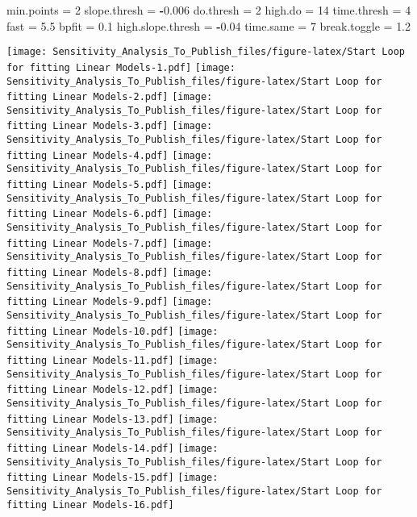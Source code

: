 \documentclass[
]{article}
\newenvironment{Shaded}{\begin{snugshade}}{\end{snugshade}}
\newcommand{\DecValTok}[1]{\textcolor[rgb]{0.00,0.00,0.81}{#1}}
\newcommand{\FloatTok}[1]{\textcolor[rgb]{0.00,0.00,0.81}{#1}}
\newcommand{\NormalTok}[1]{#1}
\newcommand{\OtherTok}[1]{\textcolor[rgb]{0.56,0.35,0.01}{#1}}
\newcommand{\SpecialCharTok}[1]{\textcolor[rgb]{0.81,0.36,0.00}{\textbf{#1}}}
\begin{document}
\begin{Shaded}
\begin{Highlighting}[]
\NormalTok{min.points }\OtherTok{=} \DecValTok{2}
\NormalTok{slope.thresh }\OtherTok{=} \SpecialCharTok{{-}}\FloatTok{0.006}
\NormalTok{do.thresh }\OtherTok{=} \DecValTok{2}
\NormalTok{high.do }\OtherTok{=} \DecValTok{14}
\NormalTok{time.thresh }\OtherTok{=} \DecValTok{4}
\NormalTok{fast }\OtherTok{=} \FloatTok{5.5} 
\NormalTok{bpfit }\OtherTok{=} \FloatTok{0.1}
\NormalTok{high.slope.thresh }\OtherTok{=} \SpecialCharTok{{-}}\FloatTok{0.04} 
\NormalTok{time.same }\OtherTok{=} \DecValTok{7}
\NormalTok{break.toggle }\OtherTok{=} \FloatTok{1.2}
\end{Highlighting}
\end{Shaded}

\texttt{[image: Sensitivity\_Analysis\_To\_Publish\_files/figure-latex/Start Loop for fitting Linear Models-1.pdf]}
\texttt{[image: Sensitivity\_Analysis\_To\_Publish\_files/figure-latex/Start Loop for fitting Linear Models-2.pdf]}
\texttt{[image: Sensitivity\_Analysis\_To\_Publish\_files/figure-latex/Start Loop for fitting Linear Models-3.pdf]}
\texttt{[image: Sensitivity\_Analysis\_To\_Publish\_files/figure-latex/Start Loop for fitting Linear Models-4.pdf]}
\texttt{[image: Sensitivity\_Analysis\_To\_Publish\_files/figure-latex/Start Loop for fitting Linear Models-5.pdf]}
\texttt{[image: Sensitivity\_Analysis\_To\_Publish\_files/figure-latex/Start Loop for fitting Linear Models-6.pdf]}
\texttt{[image: Sensitivity\_Analysis\_To\_Publish\_files/figure-latex/Start Loop for fitting Linear Models-7.pdf]}
\texttt{[image: Sensitivity\_Analysis\_To\_Publish\_files/figure-latex/Start Loop for fitting Linear Models-8.pdf]}
\texttt{[image: Sensitivity\_Analysis\_To\_Publish\_files/figure-latex/Start Loop for fitting Linear Models-9.pdf]}
\texttt{[image: Sensitivity\_Analysis\_To\_Publish\_files/figure-latex/Start Loop for fitting Linear Models-10.pdf]}
\texttt{[image: Sensitivity\_Analysis\_To\_Publish\_files/figure-latex/Start Loop for fitting Linear Models-11.pdf]}
\texttt{[image: Sensitivity\_Analysis\_To\_Publish\_files/figure-latex/Start Loop for fitting Linear Models-12.pdf]}
\texttt{[image: Sensitivity\_Analysis\_To\_Publish\_files/figure-latex/Start Loop for fitting Linear Models-13.pdf]}
\texttt{[image: Sensitivity\_Analysis\_To\_Publish\_files/figure-latex/Start Loop for fitting Linear Models-14.pdf]}
\texttt{[image: Sensitivity\_Analysis\_To\_Publish\_files/figure-latex/Start Loop for fitting Linear Models-15.pdf]}
\texttt{[image: Sensitivity\_Analysis\_To\_Publish\_files/figure-latex/Start Loop for fitting Linear Models-16.pdf]}
\end{document}
